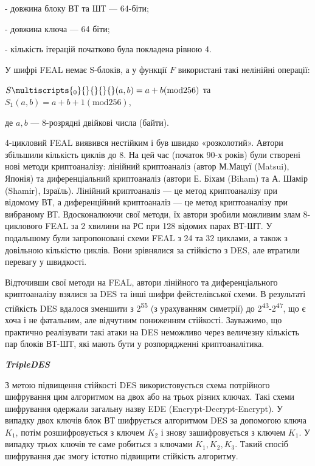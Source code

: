 {}- довжина блоку ВТ та ШТ --- 64-біти; 

{}- довжина ключа --- 64 біти;

{}- кількість ітерацій початково була покладена рівною 4.

У шифрі FEAL немає S-блоків, а у функції  ${F}$ використані такі нелінійні
операції:


${S\multiscripts{_{{0}}}{}{}{\text{}}{}(a,b)=a+b(\text{mod}\text{256})}$\textit{
 }та   ${S_{{1}}(a,b)=a+b+1(\text{mod}\text{256})}$,

де  ${a,b}$ --- 8-розрядні двійкові числа (байти).

4-цикловий FEAL виявився нестійким і був швидко «розколотий». Автори збільшили
кількість циклів до 8. На цей час (початок 90-х років) були створені нові
методи криптоаналізу: лінійний криптоаналіз (автор М.Мацуї (Matsui), Японія) та
диференціальний криптоаналіз (автори Е. Біхам (Biham) та А. Шамір (Shamir),
Ізраїль). Лінійний криптоаналіз --- це метод криптоаналізу при відомому ВТ, а
диференційний криптоаналіз --- це метод криптоаналізу при вибраному ВТ.
Вдосконалюючи свої методи, їх автори зробили можливим злам  8-циклового  FEAL
за 2 хвилини на РС при 128 відомих парах ВТ-ШТ. У подальшому були запропоновані
схеми FEAL з 24 та 32 циклами, а також з довільною кількістю циклів. Вони
зрівнялися за стійкістю з DES, але втратили  перевагу у швидкості.

Відточивши свої методи на FEAL, автори  лінійного та диференціального
криптоаналізу взялися за DES та інші шифри фейстелівської схеми. В результаті
стійкість DES вдалося зменшити з 2\textsuperscript{55} (з урахуванням симетрії)
до 2\textsuperscript{43}{}-2\textsuperscript{47}, що є хоча і не фатальним, але
відчутним пониженням стійкості. Зауважимо,  що практично реалізувати такі атаки
на DES неможливо через величезну кількість пар блоків ВТ-ШТ, які мають бути у
розпорядженні криптоаналітика.


\bigskip


\bigskip

{\centering\bfseries\itshape
TripleDES 
\par}


\bigskip

З метою підвищення стійкості DES використовується схема потрійного шифрування
цим алгоритмом на двох або на трьох різних ключах. Такі схеми шифрування
одержали загальну назву EDE (Encrypt{}-Decrypt{}-Encrypt). У випадку двох
ключів блок ВТ шифрується алгоритмом DES за допомогою ключа  ${K_{{1}}}$, потім
розшифровується  з ключем ${K_{{2}}}$ і  знову зашифровується з ключем 
${K_{{1}}}$.  У випадку трьох ключів те саме робиться з ключами 
${K_{{1}},K_{{2}},K_{{3}}}$. Такий спосіб шифрування дає змогу істотно
підвищити стійкість алгоритму.


